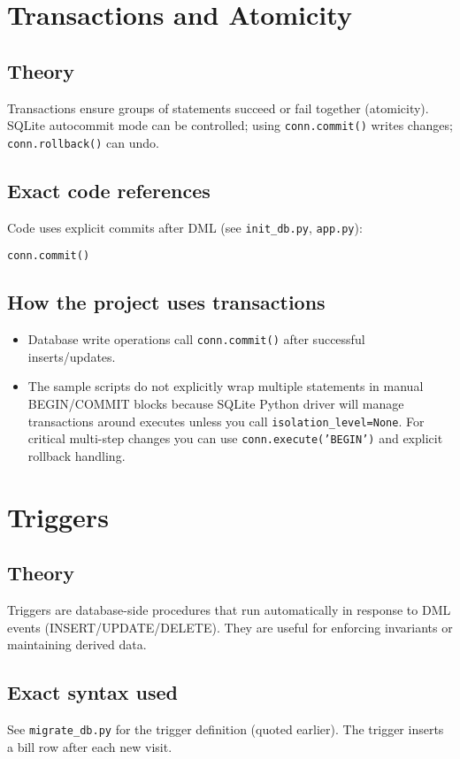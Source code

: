 \documentclass[11pt,a4paper]{article}
\begin{document}
\section{Transactions and Atomicity}
\subsection{Theory}
Transactions ensure groups of statements succeed or fail together (atomicity). SQLite autocommit mode can be controlled; using \texttt{conn.commit()} writes changes; \texttt{conn.rollback()} can undo.

\subsection{Exact code references}
Code uses explicit commits after DML (see \texttt{init_db.py}, \texttt{app.py}):
\begin{lstlisting}
conn.commit()
\end{lstlisting}

\subsection{How the project uses transactions}
\begin{itemize}
  \item Database write operations call \texttt{conn.commit()} after successful inserts/updates.
  \item The sample scripts do not explicitly wrap multiple statements in manual BEGIN/COMMIT blocks because SQLite Python driver will manage transactions around executes unless you call \texttt{isolation_level=None}. For critical multi-step changes you can use \texttt{conn.execute('BEGIN')} and explicit rollback handling.
\end{itemize}

\section{Triggers}
\subsection{Theory}
Triggers are database-side procedures that run automatically in response to DML events (INSERT/UPDATE/DELETE). They are useful for enforcing invariants or maintaining derived data.

\subsection{Exact syntax used}
See \texttt{migrate_db.py} for the trigger definition (quoted earlier). The trigger inserts a bill row after each new visit.
\end{document}
